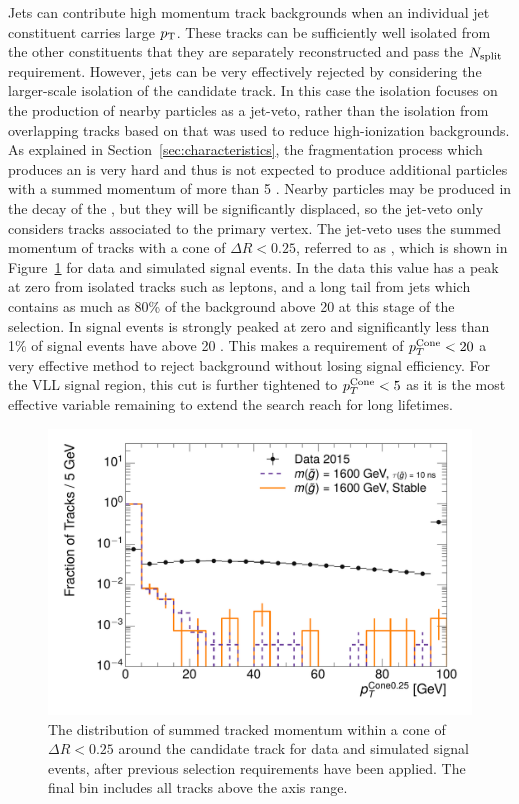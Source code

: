 Jets can contribute high momentum track backgrounds when an individual jet constituent carries large $p_{\mathrm{T}}$.
These tracks can be sufficiently well isolated from the other constituents that they are separately reconstructed and pass the $N_{\mathrm{split}}$ requirement.
However, jets can be very effectively rejected by considering the larger-scale isolation of the candidate track.
In this case the isolation focuses on the production of nearby particles as a jet-veto, rather than the isolation from overlapping tracks based on \Nsplit that was used to reduce high-ionization backgrounds.
As explained in Section~\ref{sec:characteristics}, the fragmentation process which produces an \rhadron is very hard and thus is not expected to produce additional particles with a summed momentum of more than 5 \GeV.
Nearby particles may be produced in the decay of the \rhadron, but they will be significantly displaced, so the jet-veto only considers tracks associated to the primary vertex.
The jet-veto uses the summed momentum of tracks with a cone of $\Delta R < 0.25$, referred to as \ptcone, which is shown in Figure~\ref{fig:nm1_isopt} for data and simulated signal events. 
In the data this value has a peak at zero from isolated tracks such as leptons, and a long tail from jets which contains as much as 80\% of the background above 20 \GeV at this stage of the selection.
In signal events \ptcone is strongly peaked at zero and significantly less than 1\%  of signal events have \ptcone above 20 \GeV. 
This makes a requirement of $p_T^\mathrm{Cone} < 20$ \GeV a very effective method to reject background without losing signal efficiency.
For the \ac{VLL} signal region, this cut is further tightened to $p_T^\mathrm{Cone} < 5$ \GeV as it is the most effective variable remaining to extend the search reach for long lifetimes.

\begin{figure}[h]
\centering
\includegraphics[width=\fullfig]{figures/selection_isopt_nm1.pdf}
\caption{The distribution of summed tracked momentum within a cone of $\Delta R < 0.25$ around the candidate track for data and simulated signal events, after previous selection requirements have been applied. The final bin includes all tracks above the axis range.}
\label{fig:nm1_isopt}
\end{figure}

